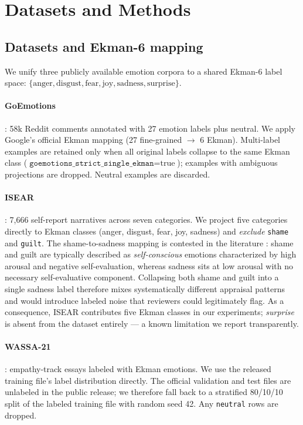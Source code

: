 \section{Datasets and Methods}
\label{sec:methods}

\subsection{Datasets and Ekman-6 mapping}
\label{sec:methods:data}

We unify three publicly available emotion corpora to a shared
Ekman-6 label space:
$\{\text{anger}, \text{disgust}, \text{fear}, \text{joy},
\text{sadness}, \text{surprise}\}$.

\paragraph{GoEmotions} \citep{demszky2020goemotions}: 58k Reddit
comments annotated with 27 emotion labels plus neutral. We apply
Google's official Ekman mapping (27 fine-grained $\rightarrow$ 6
Ekman). Multi-label examples are retained only when all original
labels collapse to the same Ekman class
($\texttt{goemotions\_strict\_single\_ekman}=\text{true}$); examples
with ambiguous projections are dropped. Neutral examples are
discarded.

\paragraph{ISEAR} \citep{scherer1994isear}: 7,666 self-report
narratives across seven categories. We project five categories
directly to Ekman classes (anger, disgust, fear, joy, sadness) and
\emph{exclude} \texttt{shame} and \texttt{guilt}. The
shame-to-sadness mapping is contested in the literature
\citep{bostan2018analysis}: shame and guilt are typically described
as \emph{self-conscious} emotions characterized by high arousal and
negative self-evaluation, whereas sadness sits at low arousal with no
necessary self-evaluative component. Collapsing both shame and guilt
into a single sadness label therefore mixes systematically different
appraisal patterns and would introduce labeled noise that reviewers
could legitimately flag. As a consequence, ISEAR contributes five
Ekman classes in our experiments; \emph{surprise} is absent from the
dataset entirely — a known limitation we report transparently.

\paragraph{WASSA-21} \citep{tafreshi2021wassa}: empathy-track essays
labeled with Ekman emotions. We use the released training file's
label distribution directly. The official validation and test files
are unlabeled in the public release; we therefore fall back to a
stratified 80/10/10 split of the labeled training file with random
seed 42. Any \texttt{neutral} rows are dropped.

